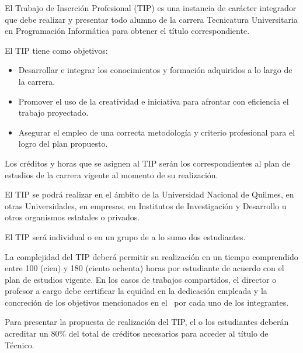 


\articulo El Trabajo de Inserción Profesional (TIP) es una instancia de
carácter integrador que debe realizar y presentar todo alumno de la carrera
Tecnicatura Universitaria en Programación Informática para obtener el título
correspondiente.

\articulo El TIP tiene como objetivos:
\begin{itemize}
 \item Desarrollar e integrar los conocimientos y formación adquiridos a lo
 largo de la carrera.
 \item Promover el uso de la creatividad e iniciativa para afrontar con
 eficiencia el trabajo proyectado.
 \item Asegurar el empleo de una correcta metodología y criterio
 profesional para el logro del plan propuesto.
\end{itemize}

\articulo Los créditos y horas que se asignen al TIP serán los
correspondientes al plan de estudios de la carrera vigente al momento de su
realización.


\articulo El TIP se podrá realizar en el ámbito de la Universidad Nacional de
Quilmes, en otras Universidades, en empresas, en Institutos de Investigación y
Desarrollo u otros organismos estatales o privados. 

\articulo El TIP será individual o en un grupo de a lo sumo dos estudiantes.

\articulo La complejidad del TIP deberá permitir su realización en un
tiempo comprendido entre 100 (cien) y 180 (ciento ochenta) horas por estudiante de
acuerdo con el plan de estudios vigente. En los casos de trabajos compartidos, el
director o profesor a cargo debe certificar la equidad en la dedicación empleada
y la concreción de los objetivos mencionados en el \artObjetivos\ por cada uno de los
integrantes. 

\articulo Para presentar la propuesta de realización del TIP, el o
los estudiantes deberán acreditar un 80\% del total de créditos necesarios para
acceder al título de Técnico. 

